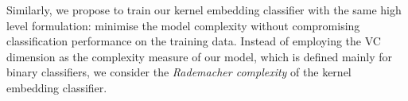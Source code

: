 \documentclass{article}
\begin{document}
	Similarly, we propose to train our kernel embedding classifier with the same high level formulation: minimise the model complexity without compromising classification performance on the training data. Instead of employing the VC dimension as the complexity measure of our model, which is defined mainly for binary classifiers, we consider the \textit{Rademacher complexity} \citep{bartlett2002rademacher} of the kernel embedding classifier.
	
	
	
\end{document}
